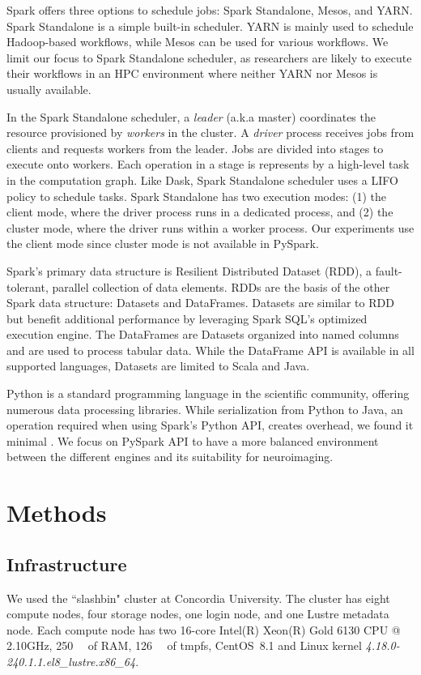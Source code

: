 \documentclass[conference]{IEEEtran}
\begin{document}
Spark offers three options to schedule jobs: Spark Standalone, Mesos, and YARN.
Spark Standalone is a simple built-in scheduler.
YARN is mainly used to schedule Hadoop-based workflows, while Mesos can be used for various workflows.
We limit our focus to Spark Standalone scheduler, as researchers are likely to 
execute their workflows in an HPC environment where neither YARN nor Mesos is usually available.

In the Spark Standalone scheduler, a \textit{leader} (a.k.a master) coordinates the resource provisioned by \textit{workers} in the cluster.
A \textit{driver}  process receives jobs from clients and requests workers from the leader.
Jobs are divided into stages to execute onto workers.
Each operation in a stage is represents by a high-level task in the computation graph.
Like Dask, Spark Standalone scheduler uses a LIFO policy to schedule tasks.
Spark Standalone has two execution modes: (1) the client mode, where the driver process runs in a dedicated process,
and (2) the cluster mode, where the driver runs within a worker process.
Our experiments use the client mode since cluster mode is not available in PySpark.

Spark's primary data structure is Resilient Distributed Dataset (RDD)\cite{RDD}, a fault-tolerant, parallel collection of data elements.
RDDs are the basis of the other Spark data structure: Datasets and DataFrames.
Datasets are similar to RDD but benefit additional performance by leveraging Spark SQL's optimized execution engine. 
The DataFrames are Datasets organized into named columns and are used to process tabular data. 
While the DataFrame API is available in all supported languages, Datasets are limited to Scala and Java. 

Python is a standard programming language in the scientific community, offering numerous data processing libraries.
While serialization from Python to Java, an operation required when using Spark's Python API, creates overhead, we found it minimal \cite{8943502}.
We focus on PySpark API to have a more balanced environment between the different engines and its suitability for neuroimaging.

\section{Methods}
\subsection{Infrastructure}
We used the ``slashbin" cluster at Concordia University.
The cluster has eight compute nodes, four storage nodes, one login node, and one Lustre metadata node.
Each compute node has two 16-core Intel(R) Xeon(R) Gold 6130 CPU @ 2.10GHz,
\SI{250}{\gibi\byte} of RAM, \SI{126}{\gibi\byte} of tmpfs,
CentOS~8.1 and Linux kernel \textit{4.18.0-240.1.1.el8\_lustre.x86\_64}.
\end{document}
